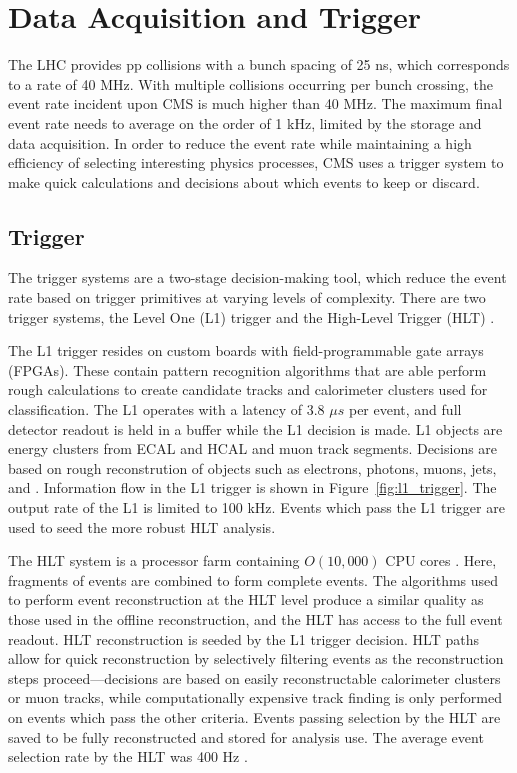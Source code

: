 \section{Data Acquisition and Trigger}
The LHC provides pp collisions with a bunch spacing of 25 ns, which corresponds to a rate of 40 MHz. With multiple collisions occurring per bunch crossing, the event rate incident upon CMS is much higher than 40 MHz. The maximum final event rate needs to average on the order of 1 kHz, limited by the storage and data acquisition. In order to reduce the event rate while maintaining a high efficiency of selecting interesting physics processes, CMS uses a trigger system to make quick calculations and decisions about which events to keep or discard. 

\subsection{Trigger}
The trigger systems are a two-stage decision-making tool, which reduce the event rate based on trigger primitives at varying levels of complexity. There are two trigger systems, the Level One (L1) trigger and the High-Level Trigger (HLT) \cite{Khachatryan:2016bia}. 

The L1 trigger resides on custom boards with field-programmable gate arrays (FPGAs). These contain pattern recognition algorithms that are able perform rough calculations to create candidate tracks and calorimeter clusters used for classification. The L1 operates with a latency of 3.8 $\mu s$ per event, and full detector readout is held in a buffer while the L1 decision is made. L1 objects are energy clusters from ECAL and HCAL and muon track segments. Decisions are based on rough reconstrution of objects such as electrons, photons, muons, jets, and \met.  Information flow in the L1 trigger is shown in Figure~\ref{fig:l1_trigger}. The output rate of the L1 is limited to 100 kHz. Events which pass the L1 trigger are used to seed the more robust HLT analysis\cite{Khachatryan:2016bia}. 



The HLT system is a processor farm containing $O(10,000)$ CPU cores \cite{Adam:2005zf}. Here, fragments of events are combined to form complete events. The algorithms used to perform event reconstruction at the HLT level produce a similar quality as those used in the offline reconstruction, and the HLT has access to the full event readout. HLT reconstruction is seeded by the L1 trigger decision. HLT paths allow for quick reconstruction by selectively filtering events as the reconstruction steps proceed---decisions are based on easily reconstructable calorimeter clusters or muon tracks, while computationally expensive track finding is only performed on events which pass the other criteria. Events passing selection by the HLT are saved to be fully reconstructed and stored for analysis use. The average event selection rate by the HLT was 400 Hz \cite{Khachatryan:2016bia}. 


